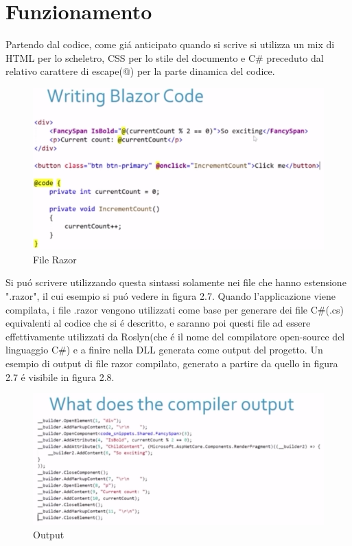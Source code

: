 \section{Funzionamento}\label{sez:funzionamento}
Partendo dal codice, come gi\'a anticipato quando si scrive si utilizza un mix di HTML per lo scheletro, CSS per lo stile del documento e C\# preceduto dal relativo carattere di escape(@) per la parte dinamica del codice.
\begin{figure}[H]
	\centerline{\includegraphics[scale=0.7]{figure/RazorFile.png}}
	\caption{File Razor\cite{ryanNowakNDCSydney}}
	\label{fig:razorFile}
\end{figure}
Si pu\'o scrivere utilizzando questa sintassi solamente nei file che hanno estensione ".razor", il cui esempio si pu\'o vedere in figura 2.7.
Quando l'applicazione viene compilata, i file .razor vengono utilizzati come base per generare dei file C\#(.cs) equivalenti al codice che si \'e descritto, e saranno poi questi file ad essere effettivamente utilizzati da Roslyn(che \'e il nome del compilatore open-source del linguaggio C\#) e a finire nella DLL generata come output del progetto.
Un esempio di output di file razor compilato, generato a partire da quello in figura 2.7 \'e visibile in figura 2.8.
\begin{figure}[H]
	\centerline{\includegraphics[scale=0.75]{figure/RazorFileCompiled.PNG}}
	\caption{Output\cite{ryanNowakNDCSydney}}
	\label{fig:compiledRazorFile}
\end{figure}
\pagebreak